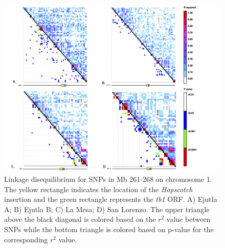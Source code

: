 \documentclass[11pt]{article} %
\begin{document}
\begin{linenumbers}
\begin{flushleft}
\begin{figure}[!t]
  \begin{center}
   \includegraphics[width=180mm]{Fig3LDPlots.png}
   \end{center}
    \caption{Linkage disequilibrium for SNPs in Mb 261-268 on chromosome 1. The yellow rectangle indicates the location of the \emph{Hopscotch} insertion and the green rectangle represents the \emph{tb1} ORF. A) Ejutla A; B) Ejutla B; C) La Mesa; D) San Lorenzo. The upper triangle above the black diagonal is colored based on the $r^{2}$ value between SNPs while the bottom triangle is colored based on p-value for the corresponding  $r^{2}$ value.}
\label{Fig3LD}
\end{figure}
\clearpage


\end{flushleft}
\end{linenumbers}
\end{document}

